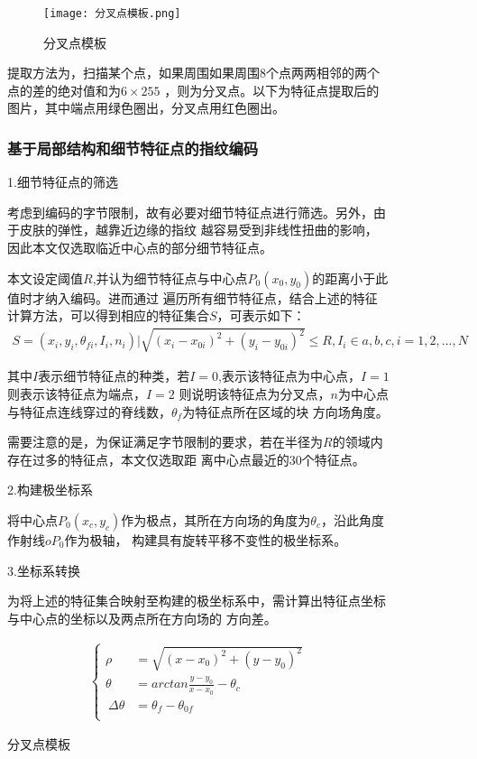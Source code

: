 \documentclass{whutmod}
\begin{document}
\begin{spacing}{1.2}
\begin{figure}[H]
\begin{figure}[H]
	\centering
	\texttt{[image: 分叉点模板.png]}
	\caption{分叉点模板}
	\label{分叉点模板}
\end{figure}


提取方法为，扫描某个点，如果周围如果周围8个点两两相邻的两个点的差的绝对值和为$6\times 255$
，则为分叉点。以下为特征点提取后的图片，其中端点用绿色圈出，分叉点用红色圈出。




\subsubsection{基于局部结构和细节特征点的指纹编码}
1.细节特征点的筛选

考虑到编码的字节限制，故有必要对细节特征点进行筛选。另外，由于皮肤的弹性，越靠近边缘的指纹
越容易受到非线性扭曲的影响，因此本文仅选取临近中心点的部分细节特征点。

本文设定阈值$R$,并认为细节特征点与中心点$P_0(x_0,y_0)$的距离小于此值时才纳入编码。进而通过
遍历所有细节特征点，结合上述的特征计算方法，可以得到相应的特征集合$S$，可表示如下：
\begin{equation}
	\label{2.6}
	\begin{split}
		 S={(x_i,y_i,\theta_{fi},I_i,n_i)|\sqrt{(x_i-x_{0i})^2+(y_i-y_{0i})^2}\leq R,I_i\in{a,b,c} ,i=1,2,...,N}
	\end{split}
\end{equation}

其中$I$表示细节特征点的种类，若$I=0$,表示该特征点为中心点，$I=1$则表示该特征点为端点，$I=2$
则说明该特征点为分叉点，$n$为中心点与特征点连线穿过的脊线数，$\theta_f$为特征点所在区域的块
方向场角度。

需要注意的是，为保证满足字节限制的要求，若在半径为$R$的领域内存在过多的特征点，本文仅选取距
离中心点最近的30个特征点。

2.构建极坐标系

将中心点$P_0(x_c,y_c)$作为极点，其所在方向场的角度为$\theta_c$，沿此角度作射线$oP_0$作为极轴，
构建具有旋转平移不变性的极坐标系。


3.坐标系转换

为将上述的特征集合映射至构建的极坐标系中，需计算出特征点坐标与中心点的坐标以及两点所在方向场的
方向差。

\begin{equation}
	\label{2.6}
	\begin{split}
		\left\{
			\begin{aligned}
			\rho & =  \sqrt{(x-x_0)^2+(y-y_0)^2} \\
			\theta& = arctan\frac{y-y_0}{x-x_0} -\theta_c \\
			\ \Delta\theta & = \theta_f-\theta_{0f}  \\
			\end{aligned}
			\right.
	\end{split}
\end{equation}



\end{figure}
\end{spacing}
\end{document}
